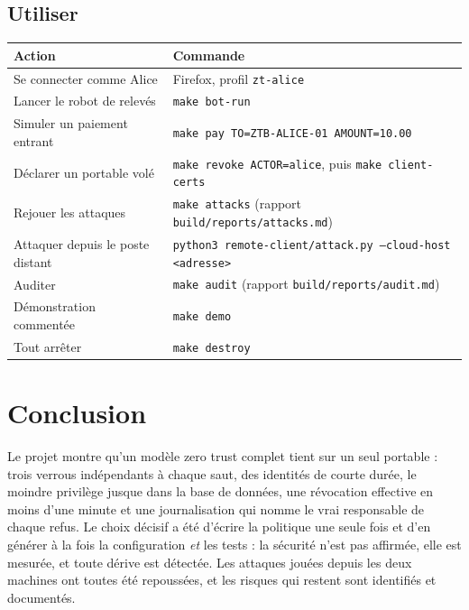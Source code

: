 \documentclass[11pt,a4paper]{article}
\newcommand{\cmd}[1]{\texttt{#1}}
\begin{document}
\subsection{Utiliser}
\begin{center}
\begin{tabularx}{\linewidth}{@{}p{5.2cm}L@{}}
\toprule
\textbf{Action} & \textbf{Commande}\\
\midrule
Se connecter comme Alice & Firefox, profil \cmd{zt-alice}\\
Lancer le robot de relevés & \cmd{make bot-run}\\
Simuler un paiement entrant & \cmd{make pay TO=ZTB-ALICE-01 AMOUNT=10.00}\\
Déclarer un portable volé & \cmd{make revoke ACTOR=alice}, puis \cmd{make client-certs}\\
Rejouer les attaques & \cmd{make attacks} (rapport \cmd{build/reports/attacks.md})\\
Attaquer depuis le poste distant & \cmd{python3 remote-client/attack.py --cloud-host <adresse>}\\
Auditer & \cmd{make audit} (rapport \cmd{build/reports/audit.md})\\
Démonstration commentée & \cmd{make demo}\\
Tout arrêter & \cmd{make destroy}\\
\bottomrule
\end{tabularx}
\end{center}

\section{Conclusion}
Le projet montre qu'un modèle zero trust complet tient sur un seul portable : trois verrous
indépendants à chaque saut, des identités de courte durée, le moindre privilège jusque dans la base
de données, une révocation effective en moins d'une minute et une journalisation qui nomme le vrai
responsable de chaque refus. Le choix décisif a été d'écrire la politique une seule fois et d'en
générer à la fois la configuration \emph{et} les tests : la sécurité n'est pas affirmée, elle est
mesurée, et toute dérive est détectée. Les attaques jouées depuis les deux machines ont toutes été
repoussées, et les risques qui restent sont identifiés et documentés.

\appendix
\end{document}
